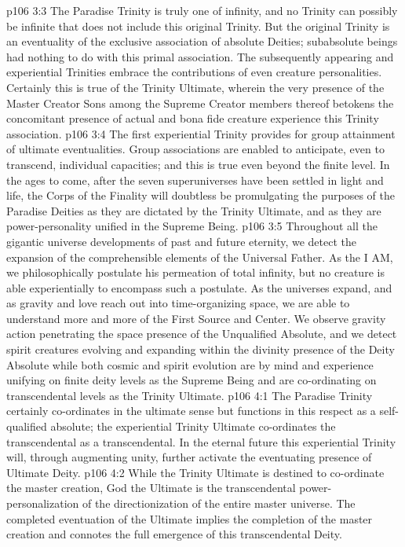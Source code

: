 \vs p106 3:3 The Paradise Trinity is truly one of infinity, and no Trinity can possibly be infinite that does not include this original Trinity. But the original Trinity is an eventuality of the exclusive association of absolute Deities; subabsolute beings had nothing to do with this primal association. The subsequently appearing and experiential Trinities embrace the contributions of even creature personalities. Certainly this is true of the Trinity Ultimate, wherein the very presence of the Master Creator Sons among the Supreme Creator members thereof betokens the concomitant presence of actual and bona fide creature experience  this Trinity association.
\vs p106 3:4 The first experiential Trinity provides for group attainment of ultimate eventualities. Group associations are enabled to anticipate, even to transcend, individual capacities; and this is true even beyond the finite level. In the ages to come, after the seven superuniverses have been settled in light and life, the Corps of the Finality will doubtless be promulgating the purposes of the Paradise Deities as they are dictated by the Trinity Ultimate, and as they are power\hyp{}personality unified in the Supreme Being.
\pc \vs p106 3:5 Throughout all the gigantic universe developments of past and future eternity, we detect the expansion of the comprehensible elements of the Universal Father. As the I AM, we philosophically postulate his permeation of total infinity, but no creature is able experientially to encompass such a postulate. As the universes expand, and as gravity and love reach out into time\hyp{}organizing space, we are able to understand more and more of the First Source and Center. We observe gravity action penetrating the space presence of the Unqualified Absolute, and we detect spirit creatures evolving and expanding within the divinity presence of the Deity Absolute while both cosmic and spirit evolution are by mind and experience unifying on finite deity levels as the Supreme Being and are co\hyp{}ordinating on transcendental levels as the Trinity Ultimate.
\vs p106 4:1 The Paradise Trinity certainly co\hyp{}ordinates in the ultimate sense but functions in this respect as a self\hyp{}qualified absolute; the experiential Trinity Ultimate co\hyp{}ordinates the transcendental as a transcendental. In the eternal future this experiential Trinity will, through augmenting unity, further activate the eventuating presence of Ultimate Deity.
\vs p106 4:2 While the Trinity Ultimate is destined to co\hyp{}ordinate the master creation, God the Ultimate is the transcendental power\hyp{}personalization of the directionization of the entire master universe. The completed eventuation of the Ultimate implies the completion of the master creation and connotes the full emergence of this transcendental Deity.
